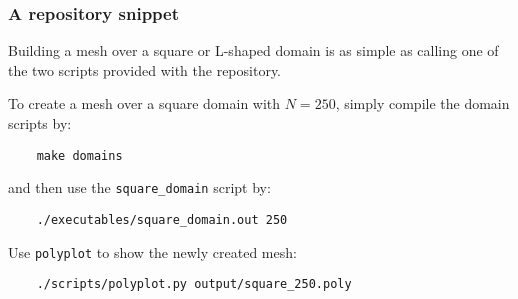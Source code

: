 \begin{frame}[fragile]
    \frametitle{A repository snippet}

    Building a mesh over a square or L-shaped domain is as simple as calling one of the two scripts provided with the repository.

    To create a mesh over a square domain with $N = 250$, simply compile the domain scripts by:

    \begin{lstlisting}
    make domains
    \end{lstlisting}

    and then use the \lstinline{square_domain} script by:

    \begin{lstlisting}
    ./executables/square_domain.out 250
    \end{lstlisting}

    Use \lstinline{polyplot} to show the newly created mesh:

    \begin{lstlisting}
    ./scripts/polyplot.py output/square_250.poly
    \end{lstlisting}

\end{frame}